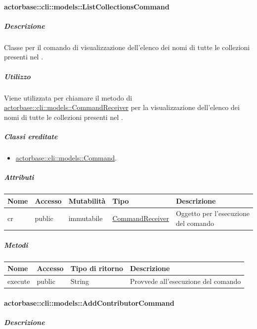 \documentclass{scalatekids-article}
\begin{document}
\paragraph{actorbase::cli::models::ListCollectionsCommand}
\label{sec:actorbase::cli::models::ListCollectionsCommand}

\subparagraph{Descrizione}

Classe per il comando di visualizzazione dell'elenco dei nomi di tutte le
collezioni presenti nel .

\subparagraph{Utilizzo}

Viene utilizzata per chiamare il metodo di
\hyperref[sec:actorbase::cli::models::CommandReceiver]{actorbase::cli::models::CommandReceiver} per la visualizzazione dell'elenco dei
nomi di tutte le collezioni presenti nel .

\subparagraph{Classi ereditate}

\begin{itemize}
\item \hyperref[sec:actorbase::cli::models::Command]{actorbase::cli::models::Command}.
\end{itemize}

\subparagraph{Attributi}

\begin{tabular}{| p{1cm} | p{1.5cm} | p{2cm} | p{4cm} | p{8.5cm} |}
  \hline
  Nome & Accesso & Mutabilità & Tipo & Descrizione\\
  \hline
  cr & public & immutabile & \hyperref[sec:actorbase::cli::models::CommandReceiver]{CommandReceiver} & Oggetto per l'esecuzione del comando\\
  \hline
\end{tabular}

\subparagraph{Metodi}

\begin{tabular}{| l | l | l | l |}
  \hline
  Nome & Accesso & Tipo di ritorno & Descrizione\\
  \hline
  execute & public & String & Provvede all'esecuzione del comando\\
  \hline
\end{tabular}

\paragraph{actorbase::cli::models::AddContributorCommand}
\label{sec:actorbase::cli::models::AddContributorCommand}

\subparagraph{Descrizione}
\end{document}
